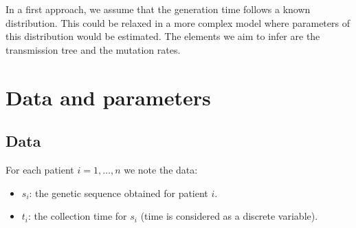 \documentclass[10pt]{article}
\begin{document}
In a first approach, we assume that the generation time follows a known distribution.
This could be relaxed in a more complex model where parameters of this distribution would be estimated.
The elements we aim to infer are the transmission tree and the mutation rates.




\section*{Data and parameters}

\subsection*{Data}
For each patient $i=1,\ldots,n$ we note the data:
\begin{itemize}
	\item $s_i$: the genetic sequence obtained for patient $i$.
	\item $t_i$: the collection time for $s_i$ (time is considered as a discrete variable).
\end{itemize}



\end{document}
